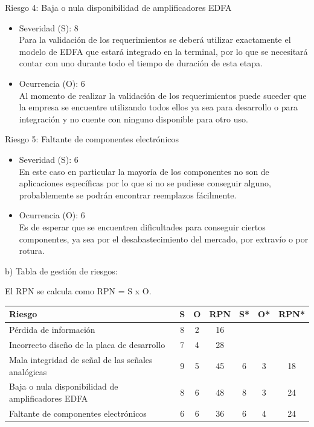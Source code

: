 \documentclass[
11pt, %
codirector, %
]{charter}
\begin{document}
Riesgo 4: Baja o nula disponibilidad de amplificadores EDFA
\begin{itemize}
	\item Severidad (S): 8 \\
	Para la validación de los requerimientos se deberá utilizar exactamente el modelo de EDFA que estará integrado en la terminal, por lo que se necesitará contar con uno durante todo el tiempo de duración de esta etapa.
	\item Ocurrencia (O): 6 \\
	Al momento de realizar la validación de los requerimientos puede suceder que la empresa se encuentre utilizando todos ellos ya sea para desarrollo o para integración y no cuente con ninguno disponible para otro uso.
\end{itemize}

Riesgo 5: Faltante de componentes electrónicos
\begin{itemize}
	\item Severidad (S): 6 \\
	En este caso en particular la mayoría de los componentes no son de aplicaciones específicas por lo que si no se pudiese conseguir alguno, probablemente se podrán encontrar reemplazos fácilmente.
	\item Ocurrencia (O): 6 \\
	Es de esperar que se encuentren dificultades para conseguir ciertos componentes, ya sea por el desabastecimiento del mercado, por extravío o por rotura.
\end{itemize}

b) Tabla de gestión de riesgos:

El RPN se calcula como RPN = S x O.

\begin{table}[H]
\centering
\begin{tabularx}{\linewidth}{@{}|X|c|c|c|c|c|c|@{}}
\hline
\rowcolor[HTML]{C0C0C0} 
Riesgo & S & O & RPN & S* & O* & RPN* \\ \hline
Pérdida de información	& 8 & 2 & 16 &    &    &      \\ \hline
Incorrecto diseño de la placa de desarrollo	& 7 & 4 & 28 &    &    &      \\ \hline
Mala integridad de señal de las señales analógicas	& 9 & 5 & \color{red}45 & 6 & 3 & 18     \\ \hline
Baja o nula disponibilidad de amplificadores EDFA	& 8 & 6 & \color{red}48 & 8 & 3 & 24	\\ \hline
Faltante de componentes electrónicos	& 6 & 6 & \color{red}36 & 6 & 4 & 24	\\ \hline
\end{tabularx}%
\end{table}
\end{document}
